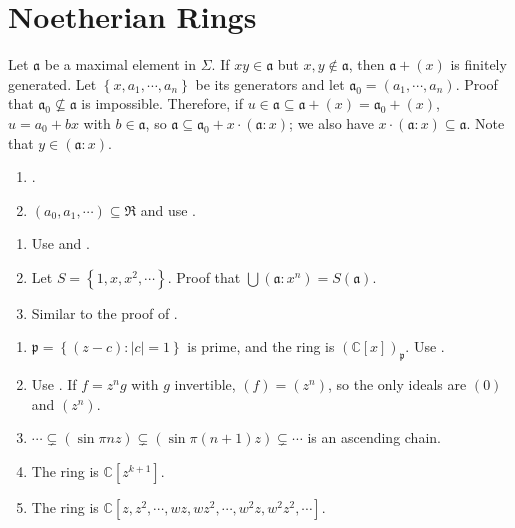 \section{Noetherian Rings}

\begin{exercise}\label{ex7.1}
	Let $\mathfrak{a}$ be a maximal element in $\Sigma$. If $xy\in\mathfrak{a}$ but $x,y\notin\mathfrak{a}$, then $\mathfrak{a}+(x)$ is finitely generated. Let $\left\{x,a_1,\cdots,a_n\right\}$ be its generators and let $\mathfrak{a}_0=\left(a_1,\cdots,a_n\right)$. Proof that $\mathfrak{a}_0\nsubseteq\mathfrak{a}$ is impossible. Therefore, if $u\in\mathfrak{a}\subseteq\mathfrak{a}+(x)=\mathfrak{a}_0+(x)$, $u=a_0+bx$ with $b\in\mathfrak{a}$, so $\mathfrak{a}\subseteq\mathfrak{a}_0+x\cdot(\mathfrak{a}:x)$; we also have $x\cdot(\mathfrak{a}:x)\subseteq\mathfrak{a}$. Note that $y\in(\mathfrak{a}:x)$.
\end{exercise}

\begin{exercise}\label{ex7.2}
	\begin{enumerate}
		\item[$\Rightarrow$:] .
		\item[$\Leftarrow$:] $\left(a_0,a_1,\cdots\right)\subseteq\mathfrak{R}$ and use .
	\end{enumerate}
\end{exercise}

\begin{exercise}\label{ex7.3}
	\begin{enumerate}
		\item[(i) $\Rightarrow$ (ii)] Use  and .
		\item[(ii) $\Rightarrow$ (iii)] Let $S=\left\{1,x,x^2,\cdots\right\}$. Proof that $\bigcup\left(\mathfrak{a}:x^n\right)=S(\mathfrak{a})$.
		\item[(iii) $\Rightarrow$ (i)] Similar to the proof of .
	\end{enumerate}
\end{exercise}

\begin{exercise}\label{ex7.4}
	\begin{enumerate}[label=(\roman*),ref=\theexercise(\roman*)]
		\item $\mathfrak{p}=\left\{(z-c):|c|=1\right\}$ is prime, and the ring is $(\mathbb{C}[x])_\mathfrak{p}$. Use .
		\item Use . If $f=z^ng$ with $g$ invertible, $(f)=\left(z^n\right)$, so the only ideals are $(0)$ and $\left(z^n\right)$.
		\item $\cdots\subsetneq(\sin\pi nz)\subsetneq(\sin\pi(n+1)z)\subsetneq\cdots$ is an ascending chain.
		\item The ring is $\mathbb{C}\left[z^{k+1}\right]$.
		\item The ring is $\mathbb{C}\left[z,z^2,\cdots,wz,wz^2,\cdots,w^2z,w^2z^2,\cdots\right]$.
	\end{enumerate}
\end{exercise}


